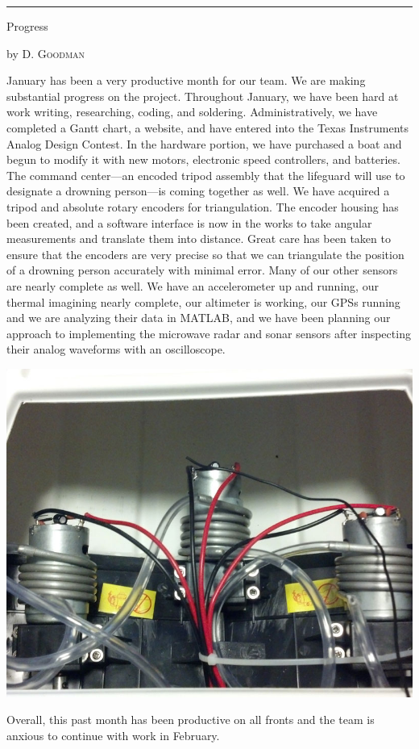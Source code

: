 \documentclass[10pt,a4paper]{article}
\newcommand{\SepRule}{\noindent							 %
						\begin{center}
							\rule{250pt}{1pt}
						\end{center}
						}
\newcommand{\NewsItem}[1]{%
		\usefont{T1}{augie}{m}{n} 	
		\large #1 \vspace{4pt}
		\par \normalsize \normalfont}
\newcommand{\NewsAuthor}[1]{%
			\hfill by \textsc{#1} \vspace{4pt}
			\par \normalfont}
\begin{document}
\vspace{0.5cm}
	\SepRule
\vspace{0.5cm}
\begin{multicols}{3}
	\NewsItem{Progress}
	\NewsAuthor{D. Goodman}
	January has been a very productive month for our team. We are making substantial progress on the project. Throughout January, we have been hard at work writing, researching, coding, and soldering. Administratively, we have completed a Gantt chart, a website, and have entered into the Texas Instruments Analog Design Contest. In the hardware portion, we have purchased a boat and begun to modify it with new motors, electronic speed controllers, and batteries.  The command center---an encoded tripod assembly that the lifeguard will use to designate a drowning person---is coming together as well. We have acquired a tripod and absolute rotary encoders for triangulation. The encoder housing has been created, and a software interface is now in the works to take angular measurements and translate them into distance. Great care has been taken to ensure that the encoders are very precise so that we can triangulate the position of a drowning person accurately with minimal error. Many of our other sensors are nearly complete as well. We have an accelerometer up and running, our thermal imagining nearly complete, our altimeter is working, our GPSs running and we are analyzing their data in MATLAB, and we have been planning our approach to implementing the microwave radar and sonar sensors after inspecting their analog waveforms with an oscilloscope. 
\begin{center}
			\includegraphics[width=0.78\linewidth]{old_motors.jpg}
		\end{center}
Overall, this past month has been productive on all fronts and the team is anxious to continue with work in February.
		

\end{multicols}
\end{document}
